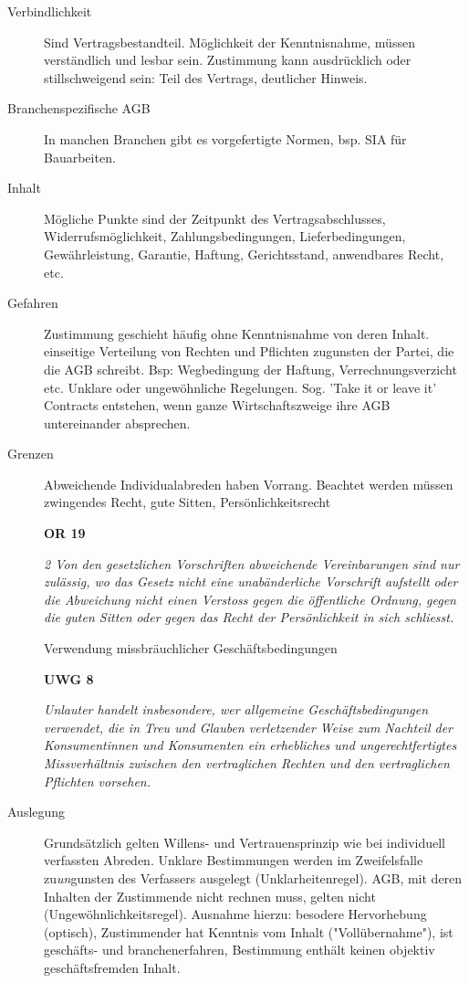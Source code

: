 \begin{description}
  \item[Verbindlichkeit] 
  Sind Vertragsbestandteil. Möglichkeit der Kenntnisnahme, müssen verständlich und lesbar sein. Zustimmung kann ausdrücklich oder stillschweigend sein: Teil des Vertrags, deutlicher Hinweis.

  \item[Branchenspezifische AGB]
  In manchen Branchen gibt es vorgefertigte Normen, bsp. SIA für Bauarbeiten.

  \item[Inhalt]
  Mögliche Punkte sind der Zeitpunkt des Vertragsabschlusses, Widerrufsmöglichkeit, Zahlungsbedingungen, Lieferbedingungen, Gewährleistung, Garantie, Haftung, Gerichtsstand, anwendbares Recht, etc.

  \item[Gefahren]
  Zustimmung geschieht häufig ohne Kenntnisnahme von deren Inhalt. einseitige Verteilung von Rechten und Pflichten zugunsten der Partei, die die AGB schreibt. Bsp: Wegbedingung der Haftung, Verrechnungsverzicht etc.
  Unklare oder ungewöhnliche Regelungen.
  Sog. 'Take it or leave it' Contracts entstehen, wenn ganze Wirtschaftszweige ihre AGB untereinander absprechen.

  \item[Grenzen]
  Abweichende Individualabreden haben Vorrang. Beachtet werden müssen zwingendes Recht, gute Sitten, Persönlichkeitsrecht

  \textbf{OR 19}

  \textit{2 Von den gesetzlichen Vorschriften abweichende Vereinbarungen sind nur zulässig, wo das Gesetz nicht eine unabänderliche Vorschrift aufstellt oder die Abweichung nicht einen Verstoss gegen die öffentliche Ordnung, gegen die guten Sitten oder gegen das Recht der Persönlichkeit in sich schliesst.}

  Verwendung missbräuchlicher Geschäftsbedingungen
  
  \textbf{UWG 8}

  \textit{Unlauter handelt insbesondere, wer allgemeine Geschäftsbedingungen verwendet, die in Treu und Glauben verletzender Weise zum Nachteil der Konsumentinnen und Konsumenten ein erhebliches und ungerechtfertigtes Missverhältnis zwischen den vertraglichen Rechten und den vertraglichen Pflichten vorsehen.}

  \item[Auslegung] Grundsätzlich gelten Willens- und Vertrauensprinzip wie bei individuell verfassten Abreden. Unklare Bestimmungen werden im Zweifelsfalle zu\textit{un}gunsten des Verfassers ausgelegt (Unklarheitenregel). AGB, mit deren Inhalten der Zustimmende nicht rechnen muss, gelten nicht (Ungewöhnlichkeitsregel). Ausnahme hierzu: besodere Hervorhebung (optisch), Zustimmender hat Kenntnis vom Inhalt ("Vollübernahme"), ist geschäfts- und branchenerfahren, Bestimmung enthält keinen objektiv geschäftsfremden Inhalt.
\end{description}

